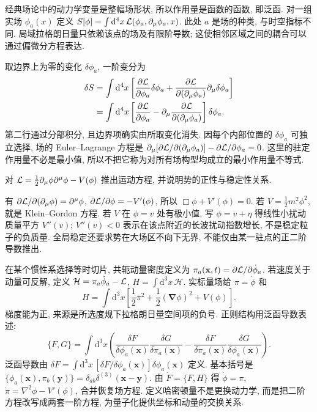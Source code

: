 \label{ch:classical-field}
经典场论中的动力学变量是整幅场形状, 所以作用量是函数的函数, 即泛函. 对一组实场 $\phi_a(x)$ 定义 $S[\phi]=\int\mathrm d^4x\,\mathcal L(\phi_a,\partial_\mu\phi_a,x)$. 此处 $a$ 是场的种类, 与时空指标不同. 局域拉格朗日量只依赖该点的场及有限阶导数; 这使相邻区域之间的耦合可以通过偏微分方程表达.

取边界上为零的变化 $\delta\phi_a$, 一阶变分为
\begin{align*}
\delta S&=\int\mathrm d^4x\left[\frac{\partial\mathcal L}{\partial\phi_a}\delta\phi_a+
\frac{\partial\mathcal L}{\partial(\partial_\mu\phi_a)}\partial_\mu\delta\phi_a\right]\\
&=\int\mathrm d^4x\left[\frac{\partial\mathcal L}{\partial\phi_a}-\partial_\mu\frac{\partial\mathcal L}{\partial(\partial_\mu\phi_a)}\right]\delta\phi_a.
\end{align*}
第二行通过分部积分, 且边界项确实由所取变化消失. 因每个内部位置的 $\delta\phi_a$ 可独立选择, 场的 Euler--Lagrange 方程是 $\partial_\mu[\partial\mathcal L/\partial(\partial_\mu\phi_a)]-\partial\mathcal L/\partial\phi_a=0$. 这里的驻定作用量不必是最小值, 所以不把它称为对所有场构型均成立的最小作用量不等式.

\begin{example}
对 $\mathcal L=\frac12\partial_\mu\phi\partial^\mu\phi-V(\phi)$ 推出运动方程, 并说明势的正性与稳定性关系.
\end{example}
\begin{solution}
有 $\partial\mathcal L/\partial(\partial_\mu\phi)=\partial^\mu\phi$, $\partial\mathcal L/\partial\phi=-V'(\phi)$, 所以 $\Box\phi+V'(\phi)=0$. 若 $V=\frac12m^2\phi^2$, 就是 Klein--Gordon 方程. 若 $V$ 在 $\phi=v$ 处有极小值, 写 $\phi=v+\eta$ 得线性小扰动质量平方 $V''(v)$; $V''(v)<0$ 表示在该点附近的长波扰动指数增长, 不是稳定粒子的负质量. 全局稳定还要求势在大场区不向下无界, 不能仅由某一驻点的正二阶导数推出.
\end{solution}

在某个惯性系选择等时切片, 共轭动量密度定义为 $\pi_a(\mathbf x,t)=\partial\mathcal L/\partial\dot\phi_a$. 若速度关于动量可反解, 定义 $\mathcal H=\pi_a\dot\phi_a-\mathcal L$, $H=\int\mathrm d^3x\,\mathcal H$. 实标量场给 $\pi=\dot\phi$ 和
\[
H=\int\mathrm d^3x\left[\frac12\pi^2+\frac12(\boldsymbol\nabla\phi)^2+V(\phi)\right].
\]
梯度能为正, 来源是所选度规下拉格朗日量空间项的负号. 正则结构用泛函导数表述:
\[
\{F,G\}=\int\mathrm d^3x\left(
\frac{\delta F}{\delta\phi_a(\mathbf x)}\frac{\delta G}{\delta\pi_a(\mathbf x)}-
\frac{\delta F}{\delta\pi_a(\mathbf x)}\frac{\delta G}{\delta\phi_a(\mathbf x)}\right).
\]
泛函导数由 $\delta F=\int\mathrm d^3x\,[\delta F/\delta\phi_a(\mathbf x)]\delta\phi_a(\mathbf x)$ 定义. 基本括号是 $\{\phi_a(\mathbf x),\pi_b(\mathbf y)\}=\delta_{ab}\delta^{(3)}(\mathbf x-\mathbf y)$. 由 $\dot F=\{F,H\}$ 得 $\dot\phi=\pi$, $\dot\pi=\nabla^2\phi-V'(\phi)$, 合并恢复场方程. 定义哈密顿量不是更换动力学, 而是把二阶方程改写成两套一阶方程, 为量子化提供坐标和动量的交换关系.

